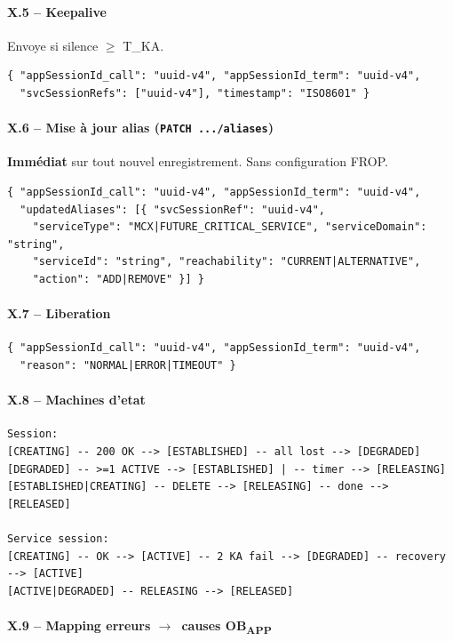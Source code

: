 \documentclass[11pt,a4paper]{article}
\newcommand{\OBAPP}{OB\textsubscript{APP}}
\newcommand{\arr}{$\to$}
\begin{document}
\paragraph{X.5 -- Keepalive}
Envoye si silence $\geq$ T\_KA.
\begin{lstlisting}[language={}]
{ "appSessionId_call": "uuid-v4", "appSessionId_term": "uuid-v4",
  "svcSessionRefs": ["uuid-v4"], "timestamp": "ISO8601" }
\end{lstlisting}

\paragraph{X.6 -- Mise à jour alias (\texttt{PATCH .../aliases})}
\textbf{Immédiat} sur tout nouvel enregistrement. Sans configuration FROP.
\begin{lstlisting}[language={}]
{ "appSessionId_call": "uuid-v4", "appSessionId_term": "uuid-v4",
  "updatedAliases": [{ "svcSessionRef": "uuid-v4",
    "serviceType": "MCX|FUTURE_CRITICAL_SERVICE", "serviceDomain": "string",
    "serviceId": "string", "reachability": "CURRENT|ALTERNATIVE",
    "action": "ADD|REMOVE" }] }
\end{lstlisting}

\paragraph{X.7 -- Liberation}
\begin{lstlisting}[language={}]
{ "appSessionId_call": "uuid-v4", "appSessionId_term": "uuid-v4",
  "reason": "NORMAL|ERROR|TIMEOUT" }
\end{lstlisting}

\paragraph{X.8 -- Machines d'etat}
\begin{lstlisting}[language={}]
Session:
[CREATING] -- 200 OK --> [ESTABLISHED] -- all lost --> [DEGRADED]
[DEGRADED] -- >=1 ACTIVE --> [ESTABLISHED] | -- timer --> [RELEASING]
[ESTABLISHED|CREATING] -- DELETE --> [RELEASING] -- done --> [RELEASED]

Service session:
[CREATING] -- OK --> [ACTIVE] -- 2 KA fail --> [DEGRADED] -- recovery --> [ACTIVE]
[ACTIVE|DEGRADED] -- RELEASING --> [RELEASED]
\end{lstlisting}

\paragraph{X.9 -- Mapping erreurs \arr\ causes \OBAPP}
\end{document}
